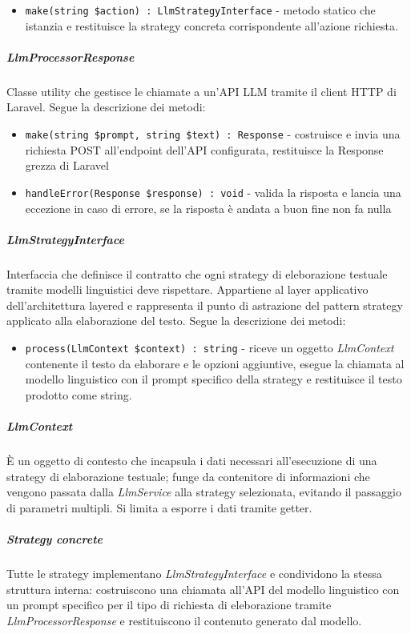 \documentclass[a4paper,10pt]{article}
\begin{document}
\begin{itemize}
    \item \texttt{make(string \$action) : LlmStrategyInterface} - metodo statico che istanzia e restituisce la strategy concreta corrispondente all'azione richiesta.
\end{itemize}
\subparagraph{LlmProcessorResponse} Classe utility che gestisce le chiamate a un'API LLM tramite il client HTTP di Laravel. Segue la descrizione dei metodi: 
\begin{itemize}
    \item \texttt{make(string \$prompt, string \$text) : Response} - costruisce e invia una richiesta POST all'endpoint dell'API configurata, restituisce la Response grezza di Laravel
    \item \texttt{handleError(Response \$response) : void} - valida la risposta e lancia una eccezione in caso di errore, se la risposta è andata a buon fine non fa nulla
\end{itemize} 
\subparagraph{LlmStrategyInterface} Interfaccia che definisce il contratto che ogni strategy di eleborazione testuale tramite modelli linguistici deve rispettare. Appartiene al layer applicativo dell'architettura layered e rappresenta il punto di astrazione del pattern strategy applicato alla elaborazione del testo. Segue la descrizione dei metodi: 
\begin{itemize}
    \item \texttt{process(LlmContext \$context) : string} - riceve un oggetto \textit{LlmContext} contenente il testo da elaborare e le opzioni aggiuntive, esegue la chiamata al modello linguistico con il prompt specifico della strategy e restituisce il testo prodotto come string.
\end{itemize}
\subparagraph{LlmContext} È un oggetto di contesto che incapsula i dati necessari all'esecuzione di una strategy di elaborazione testuale; funge da contenitore di informazioni che vengono passata dalla \textit{LlmService} alla strategy selezionata, evitando il passaggio di parametri multipli. Si limita a esporre i dati tramite getter.
\subparagraph{Strategy concrete}
Tutte le strategy implementano \textit{LlmStrategyInterface} e condividono la stessa struttura interna: costruiscono una chiamata all'API del modello linguistico con un prompt specifico per il tipo di richiesta di eleborazione tramite \textit{LlmProcessorResponse} e restituiscono il contenuto generato dal modello. 
\end{document}
